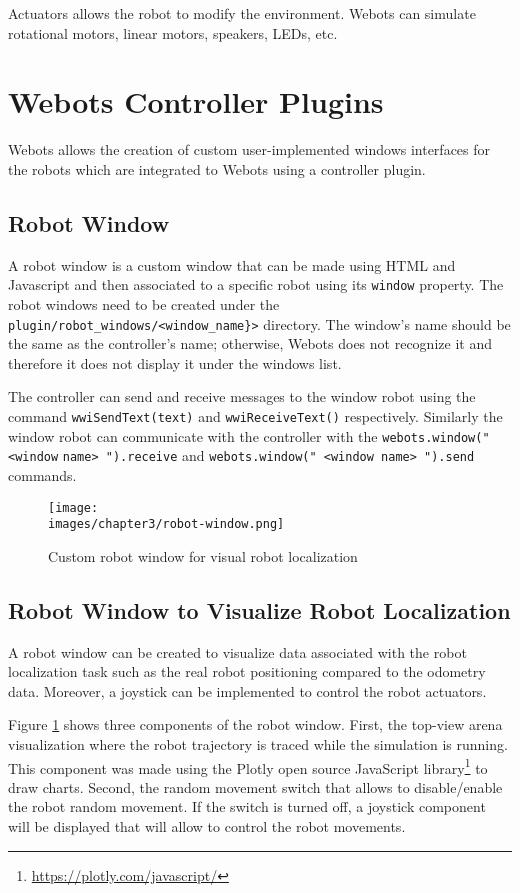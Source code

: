 Actuators allows the robot to modify the environment. Webots can simulate rotational motors, linear motors, speakers, LEDs, etc. 

\section{Webots Controller Plugins}

Webots allows the creation of custom user-implemented windows interfaces for the robots which are integrated to Webots using a controller plugin. 

\subsection{Robot Window}

A robot window is a custom window that can be made using HTML and Javascript and then associated to a specific robot using its \verb|window| property. The robot windows need to be created under the \verb|plugin/robot_windows/<window_name}>| directory. The window's name should be the same as the controller's name; otherwise, Webots does not recognize it and therefore it does not display it under the windows list.

The controller can send and receive messages to the window robot using the command \verb|wwiSendText(text)| and \verb|wwiReceiveText()| respectively. Similarly the window robot can communicate with the controller with the \verb|webots.window(" <window| \verb|name> ").receive| and \verb|webots.window(" <window name> ").send| commands. 

\begin{figure}[h!]
  \centering
  \texttt{[image: \\images/chapter3/robot-window.png]}
  \caption{Custom robot window for visual robot localization}
  \label{fig:ch-3:custom-robot-window}
\end{figure}

\subsection{Robot Window to Visualize Robot Localization}

A robot window can be created to visualize data associated with the robot localization task such as the real robot positioning compared to the odometry data. Moreover, a joystick can be implemented to control the robot actuators. 

Figure \ref{fig:ch-3:custom-robot-window} shows three components of the robot window. First, the top-view arena visualization where the robot trajectory is traced while the simulation is running. This component was made using the Plotly open source JavaScript library\footnote{\url{https://plotly.com/javascript/}} to draw charts. Second, the random movement switch that allows to disable/enable the robot random movement. If the switch is turned off, a joystick component will be displayed that will allow to control the robot movements. 

